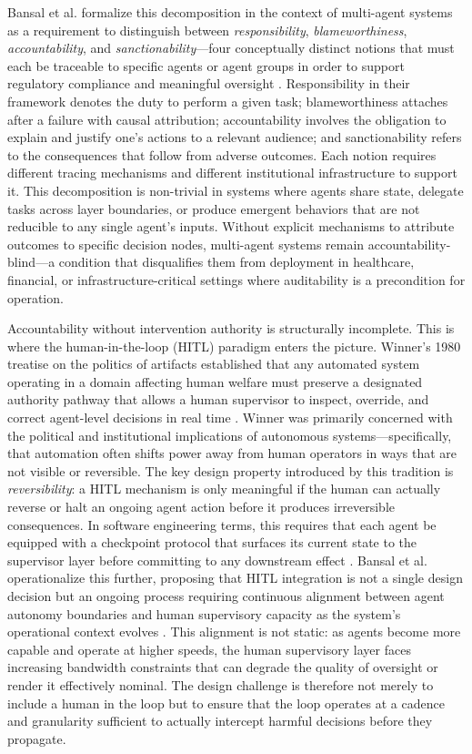 Bansal et al. formalize this decomposition in the context of multi-agent systems as a requirement to distinguish between \emph{responsibility}, \emph{blameworthiness}, \emph{accountability}, and \emph{sanctionability}—four conceptually distinct notions that must each be traceable to specific agents or agent groups in order to support regulatory compliance and meaningful oversight \cite{bansal2019}. Responsibility in their framework denotes the duty to perform a given task; blameworthiness attaches after a failure with causal attribution; accountability involves the obligation to explain and justify one's actions to a relevant audience; and sanctionability refers to the consequences that follow from adverse outcomes. Each notion requires different tracing mechanisms and different institutional infrastructure to support it. This decomposition is non-trivial in systems where agents share state, delegate tasks across layer boundaries, or produce emergent behaviors that are not reducible to any single agent's inputs. Without explicit mechanisms to attribute outcomes to specific decision nodes, multi-agent systems remain accountability-blind—a condition that disqualifies them from deployment in healthcare, financial, or infrastructure-critical settings where auditability is a precondition for operation.

Accountability without intervention authority is structurally incomplete. This is where the human-in-the-loop (HITL) paradigm enters the picture. Winner's 1980 treatise on the politics of artifacts established that any automated system operating in a domain affecting human welfare must preserve a designated authority pathway that allows a human supervisor to inspect, override, and correct agent-level decisions in real time \cite{tristr81}. Winner was primarily concerned with the political and institutional implications of autonomous systems—specifically, that automation often shifts power away from human operators in ways that are not visible or reversible. The key design property introduced by this tradition is \emph{reversibility}: a HITL mechanism is only meaningful if the human can actually reverse or halt an ongoing agent action before it produces irreversible consequences. In software engineering terms, this requires that each agent be equipped with a checkpoint protocol that surfaces its current state to the supervisor layer before committing to any downstream effect \cite{tristr81}. Bansal et al. operationalize this further, proposing that HITL integration is not a single design decision but an ongoing process requiring continuous alignment between agent autonomy boundaries and human supervisory capacity as the system's operational context evolves \cite{bansal2019}. This alignment is not static: as agents become more capable and operate at higher speeds, the human supervisory layer faces increasing bandwidth constraints that can degrade the quality of oversight or render it effectively nominal. The design challenge is therefore not merely to include a human in the loop but to ensure that the loop operates at a cadence and granularity sufficient to actually intercept harmful decisions before they propagate.

